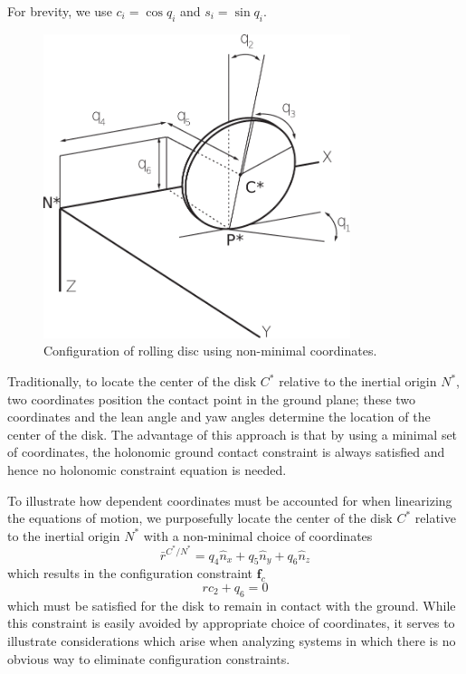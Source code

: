 \documentclass[smallcondensed,final]{svjour3}                     %
\begin{document}
For brevity, we use $c_i=\cos{q_i}$ and $s_i=\sin{q_i}$.

\begin{figure}[!htb]
    \centering
    \includegraphics[width=0.8\textwidth]{disk_drawing_cropped.pdf}
    \caption{Configuration of rolling disc using non-minimal coordinates.}
    \label{fig:rolling_disc}
\end{figure}

Traditionally, to locate the center of the disk $C^*$ relative to the inertial
origin $N^*$, two coordinates position the contact point in the ground plane;
these two coordinates and the lean angle and yaw angles determine the location
of the center of the disk. The advantage of this approach is that by using a
minimal set of coordinates, the holonomic ground contact constraint is always
satisfied and hence no holonomic constraint equation is needed.

To illustrate how dependent coordinates must be
accounted for when linearizing the equations of motion, we purposefully locate
the center of the disk $C^*$ relative to the inertial origin $N^*$ with a
non-minimal choice of coordinates
\begin{equation*}
  \bar{r}^{C^*/N^*} = q_4 \hat{n}_x + q_5 \hat{n}_y + q_6 \hat{n}_z
\end{equation*}
which results in the configuration constraint $\mathbf{f}_c$
\begin{equation}
  \label{rd:f_c}
  rc_2 + q_6 = 0
\end{equation}
which must be satisfied for the disk to remain in contact with the ground.
While this constraint is easily avoided by appropriate choice of coordinates,
it serves to illustrate considerations which arise when analyzing systems in
which there is no obvious way to eliminate configuration constraints.
\end{document}

